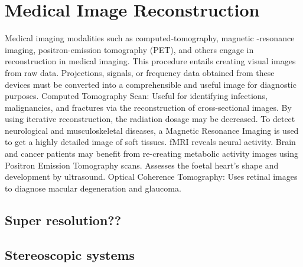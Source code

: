 \chapter{Medical Image Reconstruction}

Medical imaging modalities such as computed-tomography, magnetic -resonance imaging, positron-emission tomography (PET), and others engage in reconstruction in medical imaging. This procedure entails creating visual images from raw data. Projections, signals, or frequency data obtained from these devices must be converted into a comprehensible and useful image for diagnostic purposes. Computed Tomography Scan: Useful for identifying infections, malignancies, and fractures via the reconstruction of cross-sectional images. By using iterative reconstruction, the radiation dosage may be decreased. To detect neurological and musculoskeletal diseases, a Magnetic Resonance Imaging is used to get a highly detailed image of soft tissues. fMRI reveals neural activity. Brain and cancer patients may benefit from re-creating metabolic activity images using Positron Emission Tomography scans. Assesses the foetal heart's shape and development by ultrasound. Optical Coherence Tomography: Uses retinal images to diagnose macular degeneration and glaucoma.

\section{Super resolution??}

\section{Stereoscopic systems}